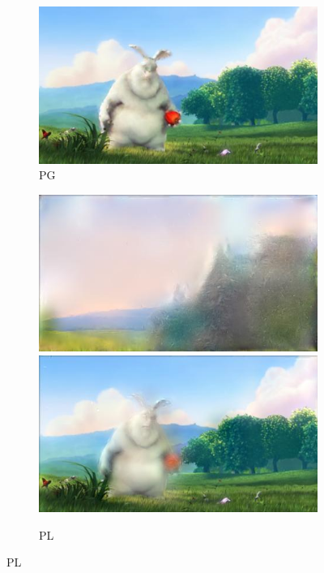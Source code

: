 \begin{figure}
\begin{subfigure}[t]{0.135\textwidth}
		\includegraphics[width=\textwidth]{figures/stereo/bbb_frame-0092-3}
		\caption{PG}
	\end{subfigure}
	\begin{subfigure}[t]{0.135\textwidth}
		\includegraphics[width=\textwidth]{figures/stereo/bbb_frame-0004-4}\\
		\includegraphics[width=\textwidth]{figures/stereo/bbb_frame-0092-4}
		\caption{PL}
	\end{subfigure}

\end{figure}
